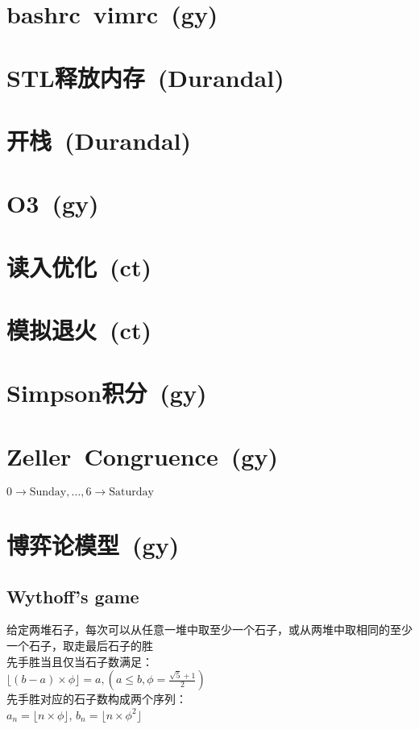 \section{bashrc\ vimrc\ \small(gy)}
\section{STL释放内存\ \small(Durandal)}
\section{开栈\ \small(Durandal)}
\section{O3\ \small(gy)}
\section{读入优化\ \small(ct)}
\section{模拟退火\ \small(ct)}
\section{Simpson积分\ \small(gy)}
\section{Zeller\ Congruence\ \small(gy)}
    $ 0 \to \text{Sunday} , \dots , 6 \to \text{Saturday} $
\section{博弈论模型\ \small(gy)}
    \subsection*{Wythoff's game}
        给定两堆石子，每次可以从任意一堆中取至少一个石子，或从两堆中取相同的至少一个石子，取走最后石子的胜
        \\先手胜当且仅当石子数满足：
        \\$\lfloor (b - a) \times \phi \rfloor=a, (a \leq b, \phi = \frac{\sqrt{5} + 1}{2})$
        \\先手胜对应的石子数构成两个序列：
        \\$a_n = \lfloor n \times \phi \rfloor$, $b_n = \lfloor n \times \phi ^ 2 \rfloor$
